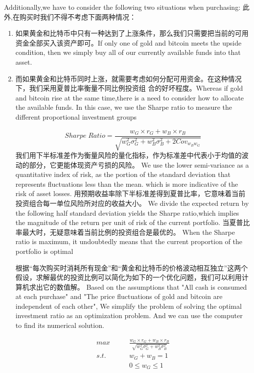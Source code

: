\documentclass{mcmthesis}
\begin{document}
Additionally,we have to consider the following two situations when purchasing:
此外,在购买时我们不得不考虑下面两种情况：
\begin{enumerate}
  \item 如果黄金和比特币中只有一种达到了上涨条件，那么我们只需要把当前的可用资金全部买入该资产即可。If only one of gold and bitcoin meets the upside condition, then we simply buy all of our currently available funds into that asset.
  \item 而如果黄金和比特币同时上涨，就需要考虑如何分配可用资金。在这种情况下，我们采用夏普比率衡量不同比例投资组
  合的好坏程度。Whereas if gold and bitcoin rise at the same time,there is a need to consider how to allocate the available funds. 
  In this case, we use the Sharpe ratio to measure the different proportional investment groups

  $$ Sharpe \; Ratio=\frac{w_G\times r_G+w_B\times r_B}{\sqrt{w_G^2 \sigma _G^2 + w_B^2 \sigma _B^2+2Cov_{w_B w_G}}}$$
  我们用下半标准差作为衡量风险的量化指标，作为标准差中代表小于均值的波动的部分，它更能体现资产亏损的风险。
We use the lower semi-variance as a quantitative index of risk, as the portion of the standard deviation that represents fluctuations less than the mean.
which is more indicative of the risk of asset losses.
  用预期收益率除下半标准差得到夏普比率，它意味着当前投资组合每一单位风险所对应的收益大小。
We divide the expected return by the following half standard deviation yields the Sharpe ratio,which implies the magnitude of the return per unit of risk of the current portfolio.
  当夏普比率最大时，无疑意味着当前比例的投资组合是最优的。
When the Sharpe ratio is maximum, it undoubtedly means that the current proportion of the portfolio is optimal

  根据“每次购买时消耗所有现金”和“黄金和比特币的价格波动相互独立”这两个假设，求解最优的投资比例可以简化为如下的一个优化问题，我们可以利用计算机求出它的数值解。
Based on the assumptions that "All cash is consumed at each purchase" and "The price fluctuations of gold and bitcoin are independent of each other", 
We simplify the problem of solving the optimal investment ratio as an optimization problem.
And we can use the computer to find its numerical solution.

  \begin{align*}
  max \qquad & \frac{w_G\times r_G+w_B\times r_B}{\sqrt{w_G^2 \sigma _G^2 + w_B^2 \sigma _B^2}}\\
  s.t. \quad & w_G+w_B=1\\
  & 0 \le w_G \le 1 
  \end{align*}

\end{enumerate}
\end{document}
